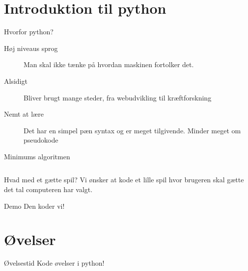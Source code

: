 \documentclass[12pt,t]{beamer}
\begin{document}
         \section{Introduktion til python}
             \begin{frame}[t]{Hvorfor python?}
                 \begin{description}
                     \item[Høj niveaus sprog] Man skal ikke tænke på hvordan
                     maskinen fortolker det.
                     \pause
                     \item[Alsidigt] Bliver brugt mange steder,
                     fra webudvikling til kræftforskning
                     \pause
                     \item[Nemt at lære] Det har en simpel pæn syntax og er meget
                     tilgivende. Minder meget om pseudokode
                 \end{description}
                 \pause
                 \begin{block}{Minimums algoritmen}
                       \inputminted{python}{min.py}
                \end{block}
             \end{frame}

            \begin{frame}{Hvad med et gætte spil?}
                 Vi ønsker at kode et lille spil hvor brugeren skal gætte
                 det tal computeren har valgt.

                \begin{block}{Demo}
                    Den koder vi!
                \end{block}
            \end{frame}

            \section{Øvelser}
            \begin{frame}[t]{Øvelsestid}
                Kode øvelser i python!
            \end{frame}
\end{document}
